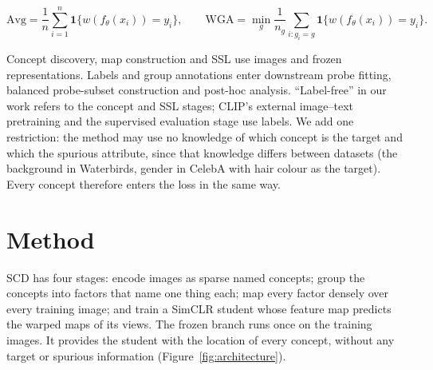 \documentclass{article}
\begin{document}
\begin{equation}
 \mathrm{Avg}=\frac{1}{n}\sum_{i=1}^{n}\mathbf{1}\{w(f_\theta(x_i))=y_i\},\qquad
 \mathrm{WGA}=\min_g\frac{1}{n_g}\sum_{i:g_i=g}\mathbf{1}\{w(f_\theta(x_i))=y_i\}.
\end{equation}

Concept discovery, map construction and SSL use images and frozen representations. Labels and group annotations enter downstream probe fitting, balanced probe-subset construction and post-hoc analysis. ``Label-free'' in our work refers to the concept and SSL stages; CLIP's external image--text pretraining and the supervised evaluation stage use labels. We add one restriction: the method may use no knowledge of which concept is the target and which the spurious attribute, since that knowledge differs between datasets (the background in Waterbirds, gender in CelebA with hair colour as the target). Every concept therefore enters the loss in the same way.

\section{Method}
SCD has four stages: encode images as sparse named concepts; group the concepts into factors that name one thing each; map every factor densely over every training image; and train a SimCLR student whose feature map predicts the warped maps of its views. The frozen branch runs once on the training images. It provides the student with the location of every concept, without any target or spurious information (Figure~\ref{fig:architecture}).
\end{document}
